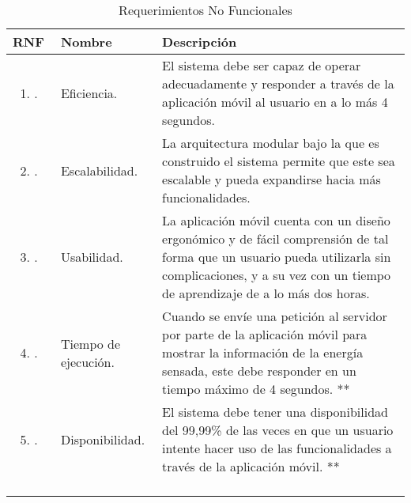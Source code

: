 \begin{longtable}{|M{1.6cm}|M{4.0cm}|M{6.0cm}|}
    \caption{Requerimientos No Funcionales}
	\hline
	\textbf{RNF} & \textbf{Nombre} & \textbf{Descripción} \\
	\hline
 	\begin{enumerate}[label=RNF\arabic*]
 	    \item.
 	\end{enumerate}
 	& Eficiencia.
 	& El sistema debe ser capaz de operar adecuadamente y responder a través de la aplicación móvil al usuario en a lo más 4 segundos.\\
    \hline
    \begin{enumerate}[label=RNF\arabic*]
        \setcounter{enumi}{1}
 	    \item.
 	\end{enumerate}
 	& Escalabilidad.
 	& La arquitectura modular bajo la que es construido el sistema permite que este sea escalable y pueda expandirse hacia más funcionalidades.\\
    \hline
    \begin{enumerate}[label=RNF\arabic*]
        \setcounter{enumi}{2}
 	    \item.
 	\end{enumerate}
 	& Usabilidad. 
 	& La aplicación móvil cuenta con un diseño ergonómico y de fácil comprensión de tal forma que un usuario pueda utilizarla sin complicaciones, y a su vez con un tiempo de aprendizaje de a lo más dos horas.\\
    \hline
    \begin{enumerate}[label=RNF\arabic*]
        \setcounter{enumi}{3}
 	    \item.
 	\end{enumerate}
 	& Tiempo de ejecución.
 	& Cuando se envíe una petición al servidor por parte de la aplicación móvil para mostrar la información de la energía sensada, este debe responder en un tiempo máximo de 4 segundos. ** \\
    \hline
    \begin{enumerate}[label=RNF\arabic*]
        \setcounter{enumi}{4}
 	    \item.
 	\end{enumerate}
 	& Disponibilidad.
 	& El sistema debe tener una disponibilidad del 99,99\% de las veces en que un usuario intente hacer uso de las funcionalidades a través de la aplicación móvil. ** \\
    \hline
    \begin{enumerate}[label=RNF\arabic*]

\end{enumerate}
\end{longtable}
